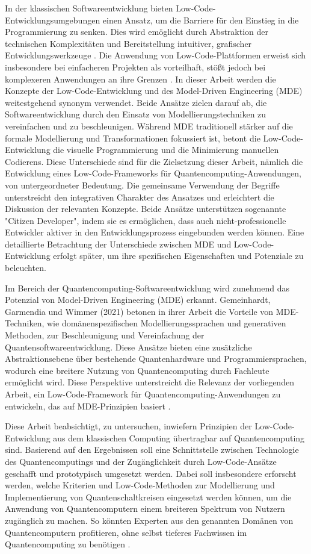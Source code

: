 In der klassischen Softwareentwicklung bieten Low-Code-Entwicklungsumgebungen einen Ansatz, um
die Barriere für den Einstieg in die Programmierung zu senken. Dies wird
emöglicht durch Abstraktion der technischen Komplexitäten und
Bereitstellung intuitiver, grafischer Entwicklungswerkzeuge \cite{Juhas2022}. Die
Anwendung von Low-Code-Plattformen erweist sich insbesondere bei
einfacheren Projekten als vorteilhaft, stößt jedoch bei komplexeren
Anwendungen an ihre Grenzen \cite{Buscher2022}. 
In dieser Arbeit werden die Konzepte der Low-Code-Entwicklung und des Model-Driven Engineering (MDE) 
weitestgehend synonym verwendet. Beide Ansätze zielen darauf ab, die Softwareentwicklung durch 
den Einsatz von Modellierungstechniken zu vereinfachen und zu beschleunigen. 
Während MDE traditionell stärker auf die formale Modellierung und Transformationen 
fokussiert ist, betont die Low-Code-Entwicklung die visuelle Programmierung und 
die Minimierung manuellen Codierens. Diese Unterschiede sind für die Zielsetzung dieser 
Arbeit, nämlich die Entwicklung eines Low-Code-Frameworks für Quantencomputing-Anwendungen, 
von untergeordneter Bedeutung. Die gemeinsame Verwendung der Begriffe unterstreicht den 
integrativen Charakter des Ansatzes und erleichtert die Diskussion der relevanten Konzepte. 
Beide Ansätze unterstützen sogenannte "Citizen Developer", indem sie es ermöglichen, 
dass auch nicht-professionelle Entwickler aktiver in den Entwicklungsprozess eingebunden werden können.
Eine detaillierte Betrachtung der Unterschiede zwischen MDE und Low-Code-Entwicklung 
erfolgt später, um ihre spezifischen Eigenschaften und Potenziale zu beleuchten.

Im Bereich der Quantencomputing-Softwareentwicklung wird zunehmend das 
Potenzial von Model-Driven Engineering (MDE) erkannt. Gemeinhardt, Garmendia und Wimmer (2021) 
betonen in ihrer Arbeit die Vorteile von MDE-Techniken, wie domänenspezifischen 
Modellierungssprachen und generativen Methoden, zur Beschleunigung und Vereinfachung 
der Quantensoftwareentwicklung. Diese Ansätze bieten eine zusätzliche Abstraktionsebene 
über bestehende Quantenhardware und Programmiersprachen, wodurch eine breitere Nutzung 
von Quantencomputing durch Fachleute ermöglicht wird. Diese Perspektive unterstreicht 
die Relevanz der vorliegenden Arbeit, ein Low-Code-Framework für Quantencomputing-Anwendungen 
zu entwickeln, das auf MDE-Prinzipien basiert \cite{gemeinhardt_2021}.

Diese Arbeit beabsichtigt, zu
untersuchen, inwiefern Prinzipien der Low-Code-Entwicklung aus dem
klassischen Computing übertragbar auf Quantencomputing sind. Basierend
auf den Ergebnissen soll eine Schnittstelle zwischen Technologie des
Quantencomputings und der Zugänglichkeit durch Low-Code-Ansätze
geschafft und prototypisch umgesetzt werden. Dabei soll insbesondere
erforscht werden, welche Kriterien und Low-Code-Methoden zur
Modellierung und Implementierung von Quantenschaltkreisen eingesetzt
werden können, um die Anwendung von Quantencomputern einem breiteren
Spektrum von Nutzern zugänglich zu machen. So
könnten Experten aus den genannten Domänen von Quantencomputern
profitieren, ohne selbst tieferes Fachwissen im Quantencomputing zu
benötigen \cite{Motta2022}.

